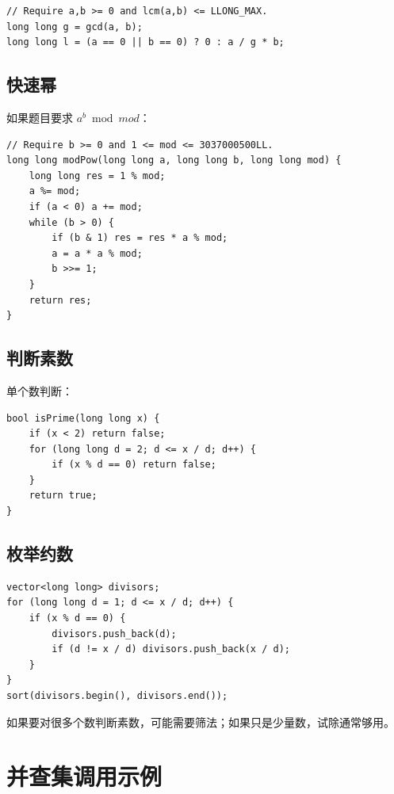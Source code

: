 \begin{lstlisting}
// Require a,b >= 0 and lcm(a,b) <= LLONG_MAX.
long long g = gcd(a, b);
long long l = (a == 0 || b == 0) ? 0 : a / g * b;
\end{lstlisting}


\subsection{快速幂}

如果题目要求 $a^b \bmod mod$：

\begin{lstlisting}
// Require b >= 0 and 1 <= mod <= 3037000500LL.
long long modPow(long long a, long long b, long long mod) {
    long long res = 1 % mod;
    a %= mod;
    if (a < 0) a += mod;
    while (b > 0) {
        if (b & 1) res = res * a % mod;
        a = a * a % mod;
        b >>= 1;
    }
    return res;
}
\end{lstlisting}

\subsection{判断素数}

单个数判断：

\begin{lstlisting}
bool isPrime(long long x) {
    if (x < 2) return false;
    for (long long d = 2; d <= x / d; d++) {
        if (x % d == 0) return false;
    }
    return true;
}
\end{lstlisting}

\subsection{枚举约数}

\begin{lstlisting}
vector<long long> divisors;
for (long long d = 1; d <= x / d; d++) {
    if (x % d == 0) {
        divisors.push_back(d);
        if (d != x / d) divisors.push_back(x / d);
    }
}
sort(divisors.begin(), divisors.end());
\end{lstlisting}

如果要对很多个数判断素数，可能需要筛法；如果只是少量数，试除通常够用。

\section{并查集调用示例}\label{sec:06-26}

